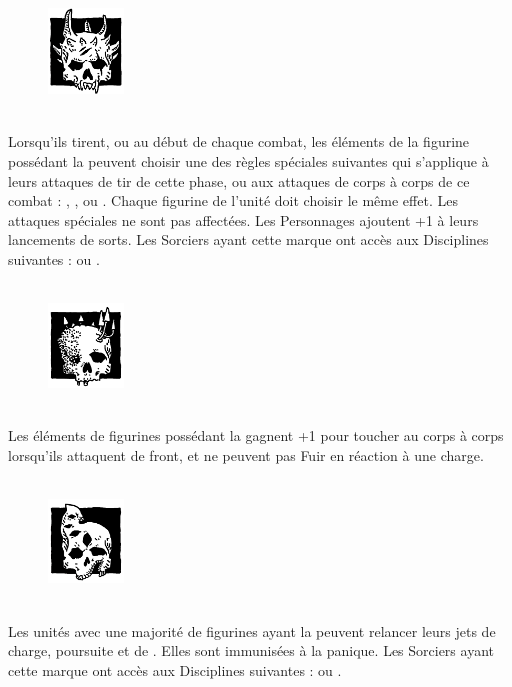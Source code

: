 \vspace{0.5cm}

\begin{figure}
\centering
\includegraphics[width=2cm]{pics/WDG2.png}
\end{figure}
\textbf{\MarkofChange{}}\\
Lorsqu'ils tirent, ou au début de chaque combat, les éléments de la figurine possédant la  peuvent choisir une des règles spéciales suivantes qui s'applique à leurs attaques de tir de cette phase, ou aux attaques de corps à corps de ce combat : \flamingattacks, \divineattacks,{\magicalattacks} ou \hellfire. Chaque figurine de l'unité doit choisir le même effet. Les attaques spéciales ne sont pas affectées. {Les Personnages } {ajoutent +1 à leurs lancements de sorts.} Les Sorciers ayant cette marque ont accès aux Disciplines suivantes : \alchemy ou \change{}. \\ \\

\vspace{0.5cm}

\begin{figure}
\centering
\includegraphics[width=2cm]{pics/WDG3.png}
\end{figure}

\textbf{\MarkofWrath{}}\\
Les éléments de figurines possédant la  gagnent +1 pour toucher au corps à corps {lorsqu'ils attaquent de front}, et ne peuvent pas Fuir en réaction à une charge.\\ \\

\vspace{0.5cm}

\begin{figure}
\centering
\includegraphics[width=2cm]{pics/WDG4.png}
\end{figure}
\textbf{\MarkofLust{}}\\
Les unités avec une majorité de figurines ayant la  peuvent relancer leurs jets de charge, poursuite et de \randommovement{}. Elles sont immunisées à la panique. Les Sorciers ayant cette marque ont accès aux Disciplines suivantes : \lust{} ou \shadows.\\ \\

